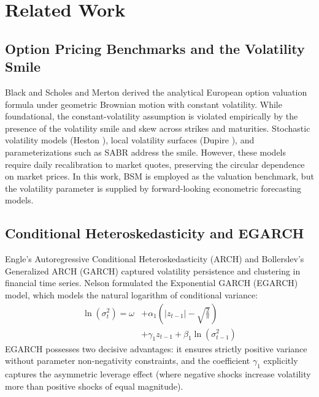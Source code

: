 \documentclass[journal]{IEEEtran}
\begin{document}
\section{Related Work}

\subsection{Option Pricing Benchmarks and the Volatility Smile}
Black and Scholes \cite{black1973} and Merton \cite{merton1973} derived the analytical European option valuation formula under geometric Brownian motion with constant volatility. While foundational, the constant-volatility assumption is violated empirically by the presence of the volatility smile and skew across strikes and maturities. Stochastic volatility models (Heston \cite{heston1993}), local volatility surfaces (Dupire \cite{dupire1994}), and parameterizations such as SABR \cite{sabr2002} address the smile. However, these models require daily recalibration to market quotes, preserving the circular dependence on market prices. In this work, BSM is employed as the valuation benchmark, but the volatility parameter is supplied by forward-looking econometric forecasting models.

\subsection{Conditional Heteroskedasticity and EGARCH}
Engle's Autoregressive Conditional Heteroskedasticity (ARCH) \cite{engle1982} and Bollerslev's Generalized ARCH (GARCH) \cite{bollerslev1986} captured volatility persistence and clustering in financial time series. Nelson \cite{nelson1991} formulated the Exponential GARCH (EGARCH) model, which models the natural logarithm of conditional variance:
\begin{equation}
\begin{aligned}
\ln(\sigma_t^2) = \omega &+ \alpha_1 \left( |z_{t-1}| - \sqrt{\frac{2}{\pi}} \right) \\
&+ \gamma_1 z_{t-1} + \beta_1 \ln(\sigma_{t-1}^2)
\end{aligned}
\end{equation}
EGARCH possesses two decisive advantages: it ensures strictly positive variance without parameter non-negativity constraints, and the coefficient $\gamma_1$ explicitly captures the asymmetric leverage effect (where negative shocks increase volatility more than positive shocks of equal magnitude).
\end{document}
